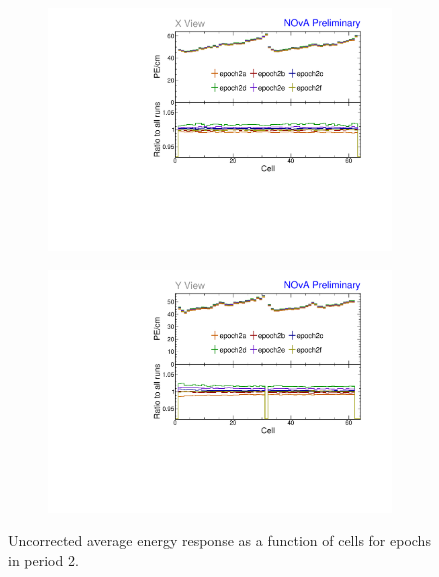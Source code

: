 \begin{figure}[h]
\centering
\begin{subfigure}[b]{0.495\textwidth}
\centering
\includegraphics[width=\textwidth]{PlotsTBCalibTechnote/Attenprofs_P2Data_CellPE_X_Combined.pdf}
\end{subfigure}
\begin{subfigure}[b]{0.495\textwidth}
\centering
\includegraphics[width=\textwidth]{PlotsTBCalibTechnote/Attenprofs_P2Data_CellPE_Y_Combined.pdf}
\end{subfigure}
\caption{Uncorrected average energy response as a function of cells for epochs in period 2.}
\label{fig:CalibhistCellPE_period2}
\end{figure}

